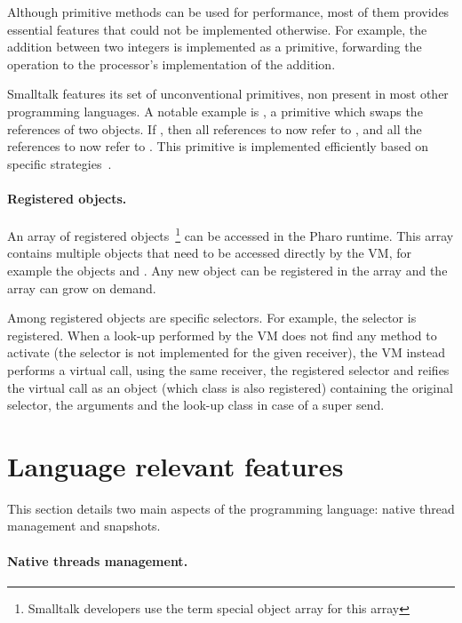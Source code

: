 \documentclass[a4paper,12pt,twoside]{../includes/ThesisStyle}
\begin{document}
Although primitive methods can be used for performance, most of them provides essential features that could not be implemented otherwise. For example, the addition between two integers is implemented as a primitive, forwarding the operation to the processor's implementation of the addition.

Smalltalk features its set of unconventional primitives, non present in most other programming languages. A notable example is , a primitive which swaps the references of two objects. If , then all references to  now refer to , and all the references to  now refer to . This primitive is implemented efficiently based on specific strategies~\cite{Mir15a}.

\paragraph{Registered objects.} An array of registered objects~\footnote{Smalltalk developers use the term special object array for this array} can be accessed in the Pharo runtime. This array contains multiple objects that need to be accessed directly by the VM, for example the objects  and . Any new object can be registered in the array and the array can grow on demand.

Among registered objects are specific selectors. For example, the  selector is registered. When a look-up performed by the VM does not find any method to activate (the selector is not implemented for the given receiver), the VM instead performs a virtual call, using the same receiver, the registered  selector and reifies the virtual call as an object (which class is also registered) containing the original selector, the arguments and the look-up class in case of a super send. 


\section{Language relevant features}

This section details two main aspects of the programming language: native thread management and snapshots.

\paragraph{Native threads management.}
\end{document}
